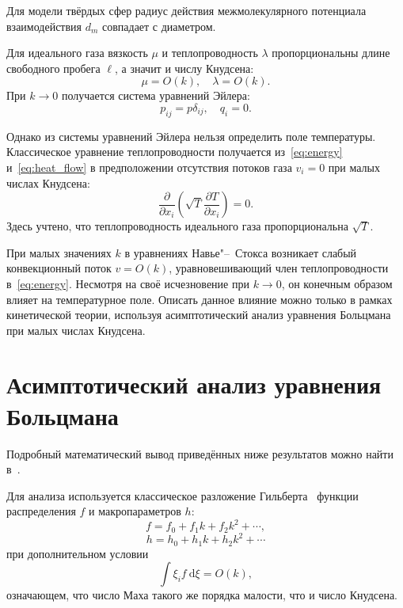 \documentclass[english,russian,a4paper,10pt]{article}
\newcommand{\dd}{\:\mathrm{d}}
\newcommand{\pder}[2][]{\frac{\partial#1}{\partial#2}}
\begin{document}
Для модели твёрдых сфер радиус действия межмолекулярного потенциала взаимодействия \(d_m\)
совпадает с диаметром.

Для идеального газа вязкость \(\mu\) и теплопроводность \(\lambda\)
пропорциональны длине свободного пробега \(\ell\), а значит и числу Кнудсена:
\begin{equation}
	\mu = O(k), \quad \lambda = O(k).
\end{equation}
При \(k\to0\) получается система уравнений Эйлера:
\begin{equation}
	p_{ij} = p\delta_{ij}, \quad q_i = 0.
\end{equation}

Однако из системы уравнений Эйлера нельзя определить поле температуры.
Классическое уравнение теплопроводности получается из~\eqref{eq:energy} и~\eqref{eq:heat_flow}
в предположении отсутствия потоков газа \(v_i = 0\) при малых числах Кнудсена:
\begin{equation}\label{eq:heat_equation}
	\pder{x_i}\left(\sqrt{T}\pder[T]{x_i}\right) = 0.
\end{equation}
Здесь учтено, что теплопроводность идеального газа пропорциональна \(\sqrt{T}\).

При малых значениях \(k\) в уравнениях Навье"--~Стокса возникает слабый конвекционный поток \(v=O(k)\),
уравновешивающий член теплопроводности в~\eqref{eq:energy}.
Несмотря на своё исчезновение при \(k\to0\), он конечным образом влияет на температурное поле.
Описать данное влияние можно только в рамках кинетической теории, используя асимптотический анализ 
уравнения Больцмана при малых числах Кнудсена.

\section{Асимптотический анализ уравнения Больцмана}
Подробный математический вывод приведённых ниже результатов можно найти в~\cite{Sone2002}.

Для анализа используется классическое разложение Гильберта~\cite{Hilbert1912}
функции распределения \(f\) и макропараметров \(h\):
\[ f = f_0 + f_1k + f_2k^2 + \cdots, \]
\[ h = h_0 + h_1k + h_2k^2 + \cdots \]
при дополнительном условии
\begin{equation}\label{eq:Mach_constraint}
	\int\xi_if\dd\xi = O(k),
\end{equation}
означающем, что число Маха такого же порядка малости, что и число Кнудсена.
\end{document}
